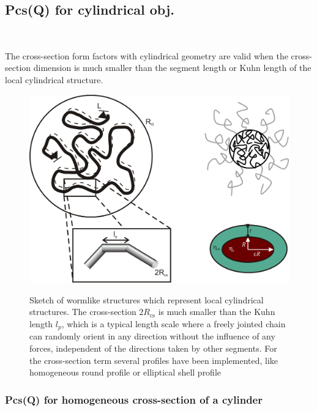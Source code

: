 \clearpage
\subsection{Pcs(Q) for cylindrical obj.} ~\\
\label{plugin:Pcs4cylindrical}

The cross-section form factors with cylindrical geometry are valid
when the cross-section dimension is much smaller than the segment length
or Kuhn length of the local cylindrical structure.

\begin{figure}[htb]
\includegraphics[width=1\textwidth]{../images/form_factor/anisotropic/SketchdiffXSWorm.png}\\
  \caption{Sketch of wormlike structures which represent local cylindrical structures. The cross-section $2R_\text{cs}$
  is much smaller than the Kuhn length $l_p$, which is a typical length scale where a freely jointed chain can randomly orient
  in any direction without the influence of any forces, independent of the directions taken by other segments.
  For the cross-section term several profiles have been implemented, like homogeneous round profile or elliptical shell profile}\label{fig:WormSketchdiffXS}
\end{figure}


\clearpage
\subsubsection{Pcs(Q) for homogeneous cross-section of a cylinder} ~\\
\label{plugin:Pcs:homogeneousXS_cyl}


